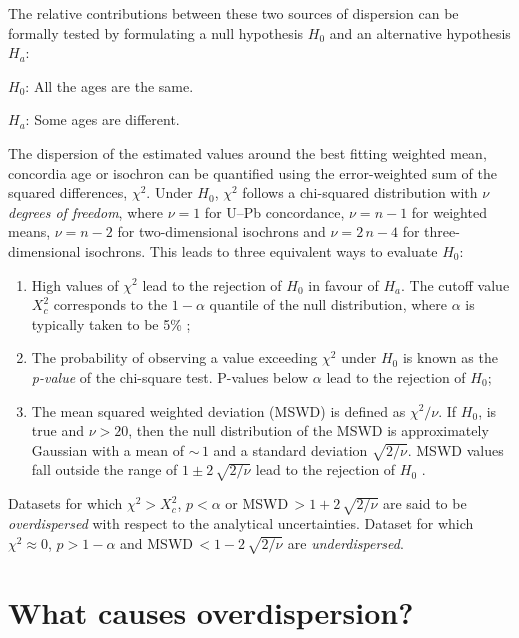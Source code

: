 \documentclass{article}
\begin{document}
The relative contributions between these two sources of dispersion can
be formally tested by formulating a null hypothesis $H_0$ and an
alternative hypothesis $H_a$:

\begin{description}
\item{$H_0$:} All the ages are the same.
\item{$H_a$:} Some ages are different.
\end{description}

The dispersion of the estimated values around the best fitting
weighted mean, concordia age or isochron can be quantified using the
error-weighted sum of the squared differences, $\chi^2$.  Under $H_0$,
$\chi^2$ follows a chi-squared distribution with $\nu$ \emph{degrees
of freedom}, where $\nu = 1$ for U--Pb concordance, $\nu = n-1$ for
weighted means, $\nu = n-2$ for two-dimensional isochrons and $\nu =
2\,n - 4$ for three-dimensional isochrons. This leads to three
equivalent ways to evaluate $H_0$:

\begin{enumerate}
\item High values of $\chi^2$ lead to the rejection of $H_0$ in favour of
  $H_a$.  The cutoff value $X_c^2$ corresponds to the $1-\alpha$
  quantile of the null distribution, where $\alpha$ is typically taken
  to be 5\% \citep{pearson1900};
\item The probability of observing a value exceeding $\chi^2$ under $H_0$
  is known as the \emph{p-value} of the chi-square test. P-values
  below $\alpha$ lead to the rejection of $H_0$;
\item The mean squared weighted deviation (MSWD) is defined as
  $\chi^2/\nu$.  If $H_0$, is true and $\nu>20$, then the null
  distribution of the MSWD is approximately Gaussian with a mean of
  $\sim\,1$ and a standard deviation $\sqrt{2/\nu}$. MSWD values fall
  outside the range of $1 \pm 2\,\sqrt{2/\nu}$ lead to the rejection
  of $H_0$ \citep{wendt1991}.
\end{enumerate}

Datasets for which $\chi^2 > X_c^2$, $p < \alpha$ or
MSWD$\,>1+2\,\sqrt{2/\nu}$ are said to be \emph{overdispersed} with
respect to the analytical uncertainties. Dataset for which
$\chi^2 \approx 0$, $p > 1-\alpha$ and MSWD$\,<1-2\,\sqrt{2/\nu}$ are
\emph{underdispersed}.

\section{What causes overdispersion?}\label{sec:overdispersion}
\end{document}
